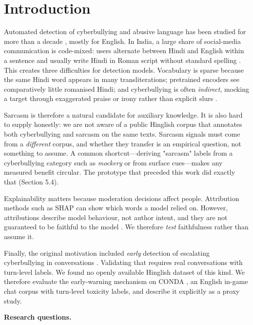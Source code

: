 \documentclass[10pt,twocolumn]{article}
\begin{document}
\section{Introduction}

Automated detection of cyberbullying and abusive language has been studied for more than a decade
\cite{salawu2020survey,vanhee2018cyberbullying,fortuna2018survey}, mostly for English. In India, a large share of
social-media communication is code-mixed: users alternate between Hindi and English within a sentence and usually write
Hindi in Roman script without standard spelling \cite{khanuja2020gluecos,bohra2018hinglish}. This creates three
difficulties for detection models. Vocabulary is sparse because the same Hindi word appears in many transliterations;
pretrained encoders see comparatively little romanised Hindi; and cyberbullying is often \emph{indirect}, mocking a target
through exaggerated praise or irony rather than explicit slurs \cite{joshi2017sarcasm}.

Sarcasm is therefore a natural candidate for auxiliary knowledge. It is also hard to supply honestly: we are not aware of
a public Hinglish corpus that annotates both cyberbullying and sarcasm on the same texts. Sarcasm signals must come from a
\emph{different} corpus, and whether they transfer is an empirical question, not something to assume. A common
shortcut---deriving "sarcasm" labels from a cyberbullying category such as \emph{mockery} or from surface cues---makes any
measured benefit circular. The prototype that preceded this work did exactly that (Section 5.4).

Explainability matters because moderation decisions affect people. Attribution methods such as SHAP
\cite{lundberg2017shap} can show which words a model relied on. However, attributions describe model behaviour, not
author intent, and they are not guaranteed to be faithful to the model \cite{jacovi2020faithfulness}. We therefore
\emph{test} faithfulness rather than assume it.

Finally, the original motivation included \emph{early} detection of escalating cyberbullying in conversations
\cite{lopezvizcaino2021early}. Validating that requires real conversations with turn-level labels. We found no openly
available Hinglish dataset of this kind. We therefore evaluate the early-warning mechanism on CONDA \cite{weld2021conda},
an English in-game chat corpus with turn-level toxicity labels, and describe it explicitly as a proxy study.

\textbf{Research questions.}
\end{document}
